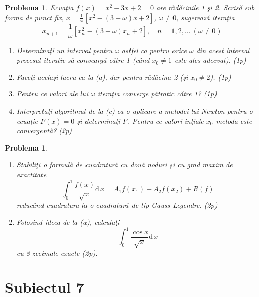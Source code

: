 \documentclass[12pt]{article}%
\newtheorem{problem}[theorem]{Problema}
\begin{document}
\begin{problem}
\label{Gautschip4.41}Ecua\c{t}ia $f(x)=x^{2}-3x+2=0$ are r\u{a}d\u{a}cinile 1
\c{s}i 2. Scris\u{a} sub forma de punct fix, $x=\frac{1}{\omega}\left[
x^{2}-\left(  3-\omega\right)  x+2\right]  $, $\omega\neq0$, sugereaz\u{a}
itera\c{t}ia%
\[
x_{n+1}=\frac{1}{\omega}\left[  x_{n}^{2}-\left(  3-\omega\right)
x_{n}+2\right]  ,\quad n=1,2,\dots~(\omega\neq0)
\]


\begin{enumerate}
\item[(a)] Determina\c{t}i un interval pentru $\omega$ astfel ca pentru orice
$\omega$ din acest interval procesul iterativ s\u{a} convearg\u{a} c\u{a}tre 1
(c\^{a}nd $x_{0}\neq1$ este ales adecvat). (1p)

\item[(b)] Face\c{t}i acela\c{s}i lucru ca la (a), dar pentru r\u{a}d\u{a}cina
2 (\c{s}i $x_{0}\neq2$). (1p)

\item[(c)] Pentru ce valori ale lui $\omega$ itera\c{t}ia converge
p\u{a}tratic c\u{a}tre 1? (1p)

\item[(d)] Interpreta\c{t}i algoritmul de la (c) ca o aplicare a metodei lui
Newton pentru o ecua\c{t}ie $F(x)=0$ \c{s}i determina\c{t}i $F$. Pentru ce
valori in\c{t}iale $x_{0}$ metoda este convergent\u{a}? (2p)
\end{enumerate}
\end{problem}

\begin{problem}


\begin{enumerate}
\item[(a)] Stabili\c{t}i o formul\u{a} de cuadratur\u{a} cu dou\u{a} noduri
\c{s}i cu grad maxim de exactitate
\[
\int_{0}^{1}\frac{f(x)}{\sqrt{x}}\mathrm{d}\,x=A_{1}f(x_{1})+A_{2}%
f(x_{2})+R(f)
\]
reduc\^{a}nd cuadratura la o cuadratur\u{a} de tip Gauss-Legendre. (2p)

\item[(b)] Folosind ideea de la (a), calcula\c{t}i
\[
\int_{0}^{1}\frac{\cos x}{\sqrt{x}}\mathrm{d}\,x
\]
cu 8 zecimale exacte (2p).
\end{enumerate}
\end{problem}

\newpage

\section*{Subiectul 7}
\end{document}
